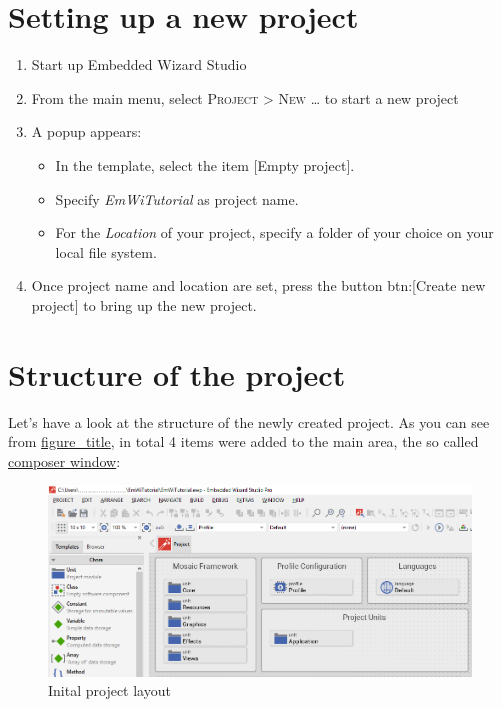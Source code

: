 \documentclass[
  a4paper,
,tablecaptionabove
]{scrbook}
\begin{document}
\hypertarget{_setting_up_a_new_project}{%
\section{Setting up a new project}\label{_setting_up_a_new_project}}

\begin{enumerate}
\def\labelenumi{\arabic{enumi}.}
\item
  Start up Embedded Wizard Studio
\item
  From the main menu, select \textsc{Project > New \ldots}​ to start a
  new project
\item
  A popup appears:

  \begin{itemize}
  \item
    In the template, select the item {[}Empty project{]}.
  \item
    Specify \emph{EmWiTutorial} as project name.
  \item
    For the \emph{Location} of your project, specify a folder of your
    choice on your local file system.
  \end{itemize}
\item
  Once project name and location are set, press the button btn:{[}Create
  new project{]} to bring up the new project.
\end{enumerate}

\hypertarget{_structure_of_the_project}{%
\section{Structure of the project}\label{_structure_of_the_project}}

Let's have a look at the structure of the newly created project. As you
can see from \protect\hyperlink{fig:ProjectLayout}{figure\_title}, in
total 4 items were added to the main area, the so called
\href{https://doc.embedded-wizard.de/composer-window}{composer window}:

\begin{figure}
\centering
\includegraphics{./../asciidoc/modules/ROOT/assets/images/helloworld/InitialProject.png}
\caption{Inital project layout}
\end{figure}
\end{document}
